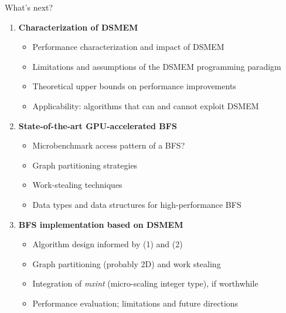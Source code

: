 \documentclass[aspectratio=169, numbering=fraction]{beamer}
\begin{document}
\begin{frame}{What's next?}
  \footnotesize
  \begin{enumerate}\itemsep0pt
    \item \textbf{Characterization of DSMEM}
      \begin{itemize}\scriptsize\itemsep0pt
        \item Performance characterization and impact of DSMEM
        \item Limitations and assumptions of the DSMEM programming paradigm
        \item Theoretical upper bounds on performance improvements
        \item Applicability: algorithms that can and cannot exploit DSMEM
      \end{itemize}
    \item \textbf{State-of-the-art GPU-accelerated BFS}
      \begin{itemize}\scriptsize\itemsep0pt
        \item Microbenchmark access pattern of a BFS?
        \item Graph partitioning strategies
        \item Work-stealing techniques
        \item Data types and data structures for high-performance BFS
      \end{itemize}
    \item \textbf{BFS implementation based on DSMEM}
      \begin{itemize}\scriptsize\itemsep0pt
        \item Algorithm design informed by (1) and (2)
        \item Graph partitioning (probably 2D) and work stealing
        \item Integration of \emph{mxint} (micro-scaling integer type), if worthwhile
        \item Performance evaluation; limitations and future directions
      \end{itemize}
  \end{enumerate}
\end{frame}
\end{document}
